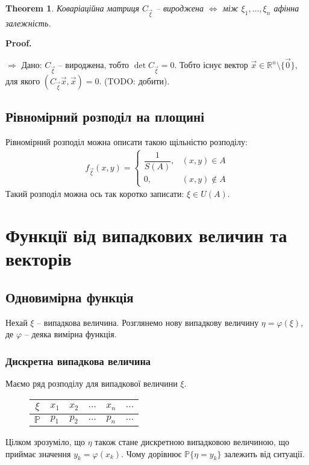 \documentclass[a4paper, 10pt]{article}
\makeatletter
\def\rightproof{$\boxed{\Rightarrow}$ }
\theoremstyle{theoremdd}
\newtheorem{theorem}{Theorem}[subsection]
\renewenvironment{proof}[1][Proof.\\]{\par
\pushQED{\hfill \qed}%
\normalfont \topsep6\p@\@plus6\p@\relax
\trivlist
\item\relax
{\bfseries
#1\@addpunct{.}}\hspace\labelsep\ignorespaces
}{%
\popQED\endtrivlist\@endpefalse
}
\makeatother
\begin{document}
\begin{theorem}
Коваріаційна матриця $C_{\vec{\xi}}$ -- вироджена $\iff$ між $\xi_1,\dots,\xi_n$ афінна залежність.
\end{theorem}

\begin{proof}
\rightproof Дано: $C_{\vec{\xi}}$ -- вироджена, тобто $\det C_{\vec{\xi}} = 0$. Тобто існує вектор $\vec{x} \in \mathbb{R}^n \setminus \{\vec{0}\}$, для якого $(C_{\vec{\xi}} \vec{x},\vec{x}) = 0$. (TODO: добити).
\end{proof}

\subsection{Рівномірний розподіл на площині}
Рівномірний розподіл можна описати такою щільністю розподілу:
\begin{align*}
f_{\vec{\xi}}(x,y) = \begin{cases} \dfrac{1}{S(A)}, & (x,y) \in A \\ 0, & (x,y) \notin A  \end{cases}
\end{align*}
Такий розподіл можна ось так коротко записати: $\xi \in U(A)$.
\newpage

\section{Функції від випадкових величин та векторів}
\subsection{Одновимірна функція}
Нехай $\xi$ -- випадкова величина. Розглянемо нову випадкову величину $\eta = \varphi(\xi)$, де $\varphi$ -- деяка вимірна функція.
\subsubsection{Дискретна випадкова величина}
Маємо ряд розподілу для випадкової величини $\xi$.
\begin{figure}[H]
\centering
\begin{tabular}{c|c|c|c|c|c}
$\xi$ & $x_1$ & $x_2$ & $\dots$ & $x_n$ & $\dots$ \\
\hline
$\mathbb{P}$ & $p_1$ & $p_2$ & $\dots$  & $p_n$ & $\dots$
\end{tabular}
\end{figure}
\noindent
Цілком зрозуміло, що $\eta$ також стане дискретною випадковою величиною, що приймає значення $y_k = \varphi(x_k)$. Чому дорівнює $\mathbb{P}\{\eta = y_k\}$ залежить від ситуації.
\end{document}
